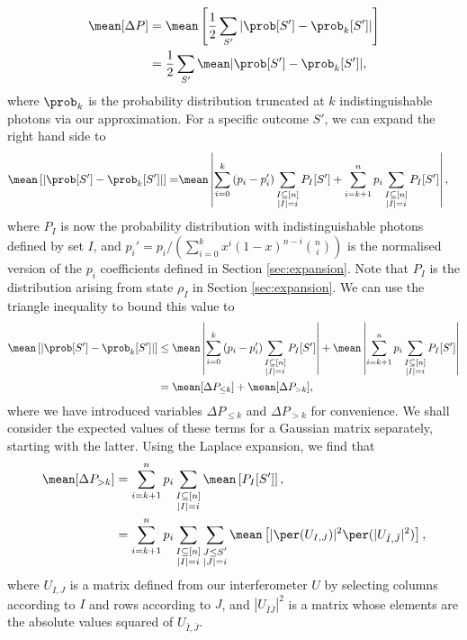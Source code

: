 \begin{align}
\mean[\Delta P] &= \mean\left[\frac{1}{2}\sum_{S'}|\prob[S']-\prob_k[S']|\right]\\
&= \frac{1}{2}\sum_{S'}\mean|\prob[S']-\prob_k[S']| \label{eqn:tvd},
\end{align}
where $\prob_k$ is the probability distribution truncated at $k$ indistinguishable photons via our approximation. For a specific outcome $S'$, we can expand the right hand side to
\begin{align}
\mean\left[|\prob[S']-\prob_k[S']|\right] = &\mean\left|\sum_{i=0}^k\left(p_i-p_i'\right)\sum_{\substack{I\subseteq[n]\\|I|=i}}P_I[S']+\sum_{i=k+1}^np_i\sum_{\substack{I\subseteq[n]\\|I|=i}}P_I[S']\right|,
\end{align}
where $P_I$ is now the probability distribution with indistinguishable photons defined by set $I$, and $p_i'=p_i/(\sum_{i=0}^kx^i(1-x)^{n-i}\binom{n}{i})$ is the normalised version of the $p_i$ coefficients defined in Section \ref{sec:expansion}. 
Note that $P_I$ is the distribution arising from state $\rho_I$ in Section \ref{sec:expansion}. 
We can use the triangle inequality to bound this value to
\begin{align}
\mean\left[|\prob[S']-\prob_k[S']|\right] &\leq \mean\left|\sum_{i=0}^k\left(p_i-p_i'\right)\sum_{\substack{I\subseteq[n]\\|I|=i}}P_I[S']\right|+\mean\left|\sum_{i=k+1}^np_i\sum_{\substack{I\subseteq[n]\\|I|=i}}P_I[S']\right|\\
&= \mean[\Delta P_{\leq k}] +\mean[\Delta P_{> k}]\label{eqn:single-outcome-error},
\end{align}
where we have introduced variables $\Delta P_{\leq k}$ and $\Delta P_{> k}$ for convenience. 
We shall consider the expected values of these terms for a Gaussian matrix separately, starting with the latter.
Using the Laplace expansion, we find that
\begin{align}
\mean[\Delta P_{>k}] &= \sum_{i=k+1}^np_i\sum_{\substack{I\subseteq[n]\\|I|=i}}\mean\left[P_I[S']\right],\\
&=\sum_{i=k+1}^np_i\sum_{\substack{I\subseteq[n]\\|I|=i}}\sum_{\substack{J\leq S'\\|J|=i}}\mean\left[|\per(U_{I,J})|^2\per(|U_{\bar{I},\bar{J}}|^2)\right],\label{eqn:laplace}
\end{align}
where $U_{I,J}$ is a matrix defined from our interferometer $U$ by selecting columns according to $I$ and rows according to $J$, and $|U_{\bar{I}\bar{J}}|^2$ is a matrix whose elements are the absolute values squared of $U_{\bar{I},\bar{J}}$.


